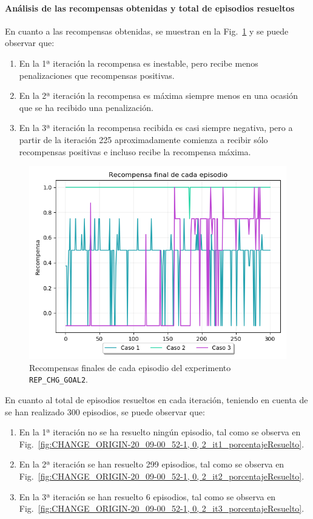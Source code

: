 \paragraph{Análisis de las recompensas obtenidas y total de episodios resueltos} 

En cuanto a las recompensas obtenidas, se muestran en la Fig.~\ref{fig:CHANGE_GOAL-20_09-21_35-1, 0, 2_recompensa} y se puede observar que: 
\begin{enumerate}
    \item En la 1ª iteración la recompensa es inestable, pero recibe menos penalizaciones que recompensas positivas. 
    \item En la 2ª iteración la recompensa es máxima siempre menos en una ocasión que se ha recibido una penalización. 
    \item En la 3ª iteración la recompensa recibida es casi siempre negativa, pero a partir de la iteración 225 aproximadamente comienza a recibir sólo recompensas positivas e incluso recibe la recompensa máxima. 
\end{enumerate}

\begin{figure}
    \centering
    \includegraphics[scale=0.4]{cap5_experimentacion/images/CHANGE_GOAL-20_09-21_35-1, 0, 2_recompensa.png}
    \caption{Recompensas finales de cada episodio del experimento \texttt{REP\_CHG\_GOAL2}.}
    \label{fig:CHANGE_GOAL-20_09-21_35-1, 0, 2_recompensa}
\end{figure}

En cuanto al total de episodios resueltos en cada iteración, teniendo en cuenta de se han realizado 300 episodios, se puede observar que: 
\begin{enumerate}
    \item En la 1ª iteración no se ha resuelto ningún episodio, tal como se observa en Fig.~\ref{fig:CHANGE_ORIGIN-20_09-00_52-1, 0, 2_it1_porcentajeResuelto}.
    \item En la 2ª iteración se han resuelto 299 episodios, tal como se observa en Fig.~\ref{fig:CHANGE_ORIGIN-20_09-00_52-1, 0, 2_it2_porcentajeResuelto}.
    \item En la 3ª iteración se han resuelto 6 episodios, tal como se observa en Fig.~\ref{fig:CHANGE_ORIGIN-20_09-00_52-1, 0, 2_it3_porcentajeResuelto}.
\end{enumerate}

